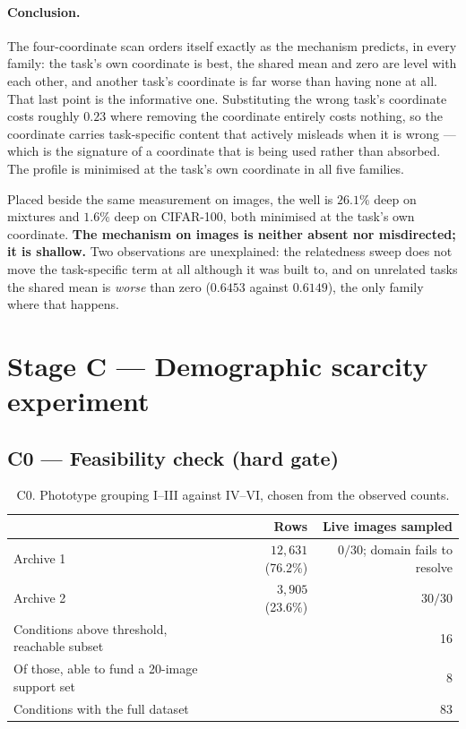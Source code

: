 \documentclass{article}
\begin{document}
\paragraph{Conclusion.} The four-coordinate scan orders itself exactly as the mechanism
predicts, in every family: the task's own coordinate is best, the shared mean and zero are
level with each other, and another task's coordinate is far worse than having none at all.
That last point is the informative one. Substituting the wrong task's coordinate costs
roughly $0.23$ where removing the coordinate entirely costs nothing, so the coordinate
carries task-specific content that actively misleads when it is wrong --- which is the
signature of a coordinate that is being used rather than absorbed. The profile is minimised
at the task's own coordinate in all five families.

Placed beside the same measurement on images, the well is $26.1\%$ deep on mixtures and
$1.6\%$ deep on CIFAR-100, both minimised at the task's own coordinate. \textbf{The
mechanism on images is neither absent nor misdirected; it is shallow.} Two observations are
unexplained: the relatedness sweep does not move the task-specific term at all although it
was built to, and on unrelated tasks the shared mean is \emph{worse} than zero
($0.6453$ against $0.6149$), the only family where that happens.

\FloatBarrier

\section{Stage C --- Demographic scarcity experiment}

\subsection{C0 --- Feasibility check (hard gate)}

\begin{table}[h]
\centering
\small
\begin{tabular}{lrr}
\toprule
& Rows & Live images sampled\\
\midrule
Archive 1 & $12{,}631$ (76.2\%) & $0 / 30$; domain fails to resolve\\
Archive 2 & $3{,}905$ (23.6\%) & $30 / 30$\\
\midrule
Conditions above threshold, reachable subset & \multicolumn{2}{r}{16}\\
Of those, able to fund a 20-image support set & \multicolumn{2}{r}{8}\\
Conditions with the full dataset & \multicolumn{2}{r}{83}\\
\bottomrule
\end{tabular}
\caption{C0. Phototype grouping I--III against IV--VI, chosen from the observed counts.}
\end{table}
\end{document}
